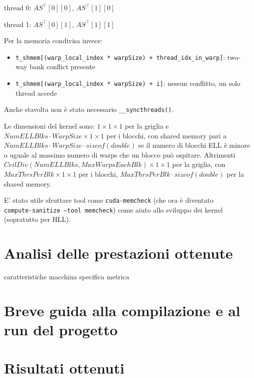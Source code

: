 \documentclass[9pt]{extarticle}
\begin{document}
\begin{minipage}{\linewidth}
\centering
thread 0: $AS^{\top}[0][0]$, $AS^{\top}[1][0]$

thread 1: $AS^{\top}[0][1]$, $AS^{\top}[1][1]$
\end{minipage}

Per la memoria condivisa invece:
\begin{itemize}
	\item \texttt{t\_shmem[(warp\_local\_index * warpSize) + thread\_idx\_in\_warp]}: two-way bank conflict presente
	\item \texttt{t\_shmem[(warp\_local\_index * warpSize) + i]}: nessun conflitto, un solo thread accede
\end{itemize}
Anche stavolta non è stato necessario \texttt{\_\_syncthreads()}.

Le dimensioni del kernel sono: $1 \times 1 \times 1$ per la griglia e $NumELLBlks \cdot WarpSize \times 1 \times 1$ per i blocchi, con
shared memory pari a $NumELLBlks \cdot WarpSize \cdot sizeof(double)$ se il numero di blocchi ELL è minore o uguale
al massimo numero di warps che un blocco può ospitare. Altrimenti \\ 
$CeilDiv(NumELLBlks, MaxWarpsEachBlk) \times 1 \times 1$ 
per la griglia, con \\ $MaxThrsPerBlk \times 1 \times 1$  per i blocchi, $MaxThrsPerBlk \cdot sizeof(double)$ per la shared
memory.

E' stato utile sfruttare tool come \texttt{cuda-memcheck} (che ora è diventato \\ \texttt{compute-sanitize --tool memcheck})
come aiuto allo sviluppo dei kernel (sopratutto per HLL).

\section{Analisi delle prestazioni ottenute}
caratteristiche macchina
specifica metrica

\section{Breve guida alla compilazione e al run del progetto}

\pagebreak
	
\section{Risultati ottenuti}
\end{document}
